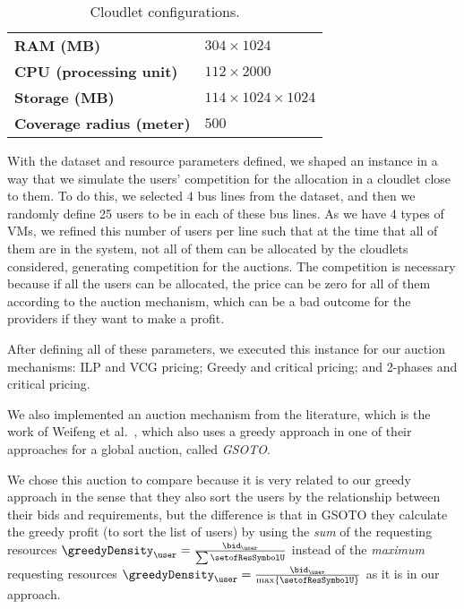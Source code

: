 \documentclass[English]{ic-tese-v3}
\begin{document}
\begin{table}[H]
\begin{center}
    \begin{tabular}{@{}ll@{}}
    \toprule
    \textbf{RAM (MB)}                & $304 \times 1024$      \\ 
    \textbf{CPU (processing unit)}              & $112\times2000$           \\ 
    \textbf{Storage (MB)}            & $114 \times1024\times1024$ \\ 
    \textbf{Coverage radius (meter)} & $500$           \\ \bottomrule
    \end{tabular}
    \caption{\label{tab:cloudlet-parameters}Cloudlet configurations.}
\end{center}
\end{table}
With the dataset and resource parameters defined, we shaped an instance in a way that we simulate the users' competition for the allocation in a cloudlet close to them. To do this, we selected $4$ bus lines from the dataset, and then we randomly define 25 users to be in each of these bus lines. As we have 4 types of VMs, we refined this number of users per line such that at the time that all of them are in the system, not all of them can be allocated by the cloudlets considered, generating competition for the auctions. The competition is necessary because if all the users can be allocated, the price can be zero for all of them according to the auction mechanism, which can be a bad outcome for the providers if they want to make a profit.

After defining all of these parameters, we executed this instance for our auction mechanisms: ILP and VCG pricing; Greedy and critical pricing; and 2-phases and critical pricing.

We also implemented an auction mechanism from the literature, which is the work of Weifeng et al.~\cite{WeifengAuction2022}, which also uses a greedy approach in one of their approaches for a global auction, called \emph{GSOTO}. 

We chose this auction to compare because it is very related to our greedy approach in the sense that they also sort the users by the relationship between their bids and requirements, but the difference is that in GSOTO they calculate the greedy profit (to sort the list of users) by using the \emph{sum} of the requesting resources $\greedyDensity_{\user} = \frac{\bid_{\user}}{\sum \setofResSymbolU}$ instead of the \emph{maximum} requesting resources $\greedyDensity_{\user} = \frac{\bid_{\user}}{\max\{\setofResSymbolU\}}$ as it is in our approach. 
\end{document}
